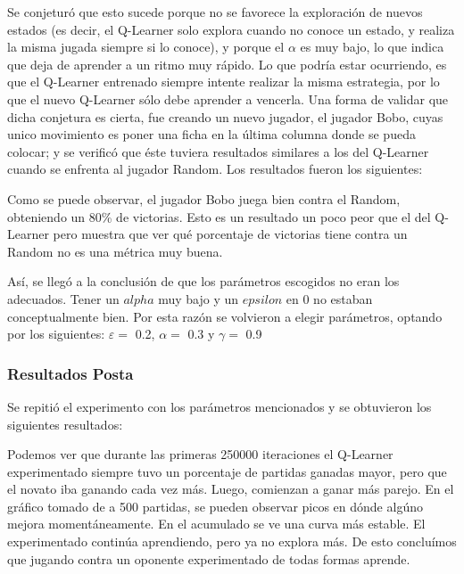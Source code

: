 Se conjeturó que esto sucede porque no se favorece la exploración de nuevos estados (es decir, el Q-Learner solo explora cuando no conoce un estado, y realiza la misma jugada siempre si lo conoce), y porque el $\alpha$ es muy bajo, lo que indica que deja de aprender a un ritmo muy rápido. Lo que podría estar ocurriendo, es que el Q-Learner entrenado siempre intente realizar la misma estrategia, por lo que el nuevo Q-Learner sólo debe aprender a vencerla.
Una forma de validar que dicha conjetura es cierta, fue creando un nuevo jugador, el jugador Bobo, cuyas unico movimiento es poner una ficha en la última columna donde se pueda colocar; y se verificó que éste tuviera resultados similares a los del Q-Learner cuando se enfrenta al jugador Random.
Los resultados fueron los siguientes:



Como se puede observar, el jugador Bobo juega bien contra el Random, obteniendo un 80\% de victorias. Esto es un resultado un poco peor que el del Q-Learner pero muestra que ver qué porcentaje de victorias tiene contra un Random no es una métrica muy buena.

Así, se llegó a la conclusión de que los parámetros escogidos no eran los adecuados. Tener un $alpha$ muy bajo y un $epsilon$ en 0 no estaban conceptualmente bien. Por esta razón se volvieron a elegir parámetros, optando por los siguientes: $\varepsilon = $ 0.2, $\alpha = $ 0.3 y $\gamma = $ 0.9

\subsubsection{Resultados Posta}

Se repitió el experimento con los parámetros mencionados y se obtuvieron los siguientes resultados:



Podemos ver que durante las primeras 250000 iteraciones el Q-Learner experimentado siempre tuvo un porcentaje de partidas ganadas mayor, pero que el novato iba ganando cada vez más. Luego, comienzan a ganar más parejo. En el gráfico tomado de a 500 partidas, se pueden observar picos en dónde algúno mejora momentáneamente. En el acumulado se ve una curva más estable. El experimentado continúa aprendiendo, pero ya no explora más. De esto concluímos que jugando contra un oponente experimentado de todas formas aprende.

